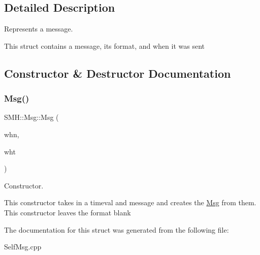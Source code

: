 \subsection{Detailed Description}
Represents a message. 

This struct contains a message, its format, and when it was sent 

\subsection{Constructor \& Destructor Documentation}
\mbox{\label{struct_s_m_h_1_1_msg_a8c0752c26661975e08bdf6321eeea6b5}} 
\subsubsection{\texorpdfstring{Msg()}{Msg()}}
{\footnotesize\ttfamily S\+M\+H\+::\+Msg\+::\+Msg (\begin{DoxyParamCaption}\item[{const timeval \&}]{whn,  }\item[{const C\+String}]{wht }\end{DoxyParamCaption})\hspace{0.3cm}{\ttfamily [inline]}}



Constructor. 

This constructor takes in a timeval and message and creates the \hyperlink{struct_s_m_h_1_1_msg}{Msg} from them. This constructor leaves the format blank 

The documentation for this struct was generated from the following file\+:\begin{DoxyCompactItemize}
\item 
Self\+Msg.\+cpp\end{DoxyCompactItemize}
